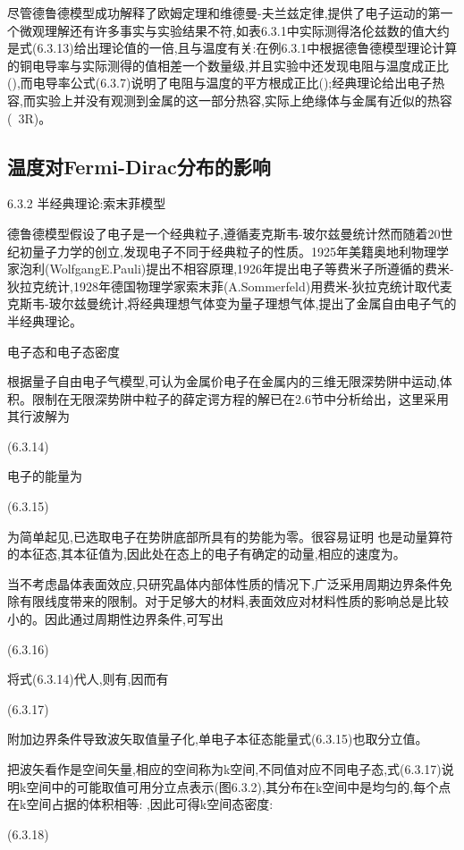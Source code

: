 尽管德鲁德模型成功解释了欧姆定理和维德曼-夫兰兹定律,提供了电子运动的第一个微观理解还有许多事实与实验结果不符,如表6.3.1中实际测得洛伦兹数的值大约是式(6.3.13)给出理论值的一倍,且与温度有关:在例6.3.1中根据德鲁德模型理论计算的铜电导率与实际测得的值相差一个数量级,并且实验中还发现电阻与温度成正比(),而电导率公式(6.3.7)说明了电阻与温度的平方根成正比();经典理论给出电子热容,而实验上并没有观测到金属的这一部分热容,实际上绝缘体与金属有近似的热容(~3R)。


\subsection{温度对Fermi-Dirac分布的影响}
6.3.2 半经典理论:索末菲模型

德鲁德模型假设了电子是一个经典粒子,遵循麦克斯韦-玻尔兹曼统计然而随着20世纪初量子力学的创立,发现电子不同于经典粒子的性质。1925年美籍奥地利物理学家泡利(WolfgangE.Pauli)提出不相容原理,1926年提出电子等费米子所遵循的费米-狄拉克统计,1928年德国物理学家索末菲(A.Sommerfeld)用费米-狄拉克统计取代麦克斯韦-玻尔兹曼统计,将经典理想气体变为量子理想气体,提出了金属自由电子气的半经典理论。

电子态和电子态密度

根据量子自由电子气模型,可认为金属价电子在金属内的三维无限深势阱中运动,体积。限制在无限深势阱中粒子的薛定谔方程的解已在2.6节中分析给出，这里采用其行波解为

 	(6.3.14)



电子的能量为

 	(6.3.15)

为简单起见,已选取电子在势阱底部所具有的势能为零。很容易证明 也是动量算符的本征态,其本征值为,因此处在态上的电子有确定的动量,相应的速度为。

当不考虑晶体表面效应,只研究晶体内部体性质的情况下,广泛采用周期边界条件免除有限线度带来的限制。对于足够大的材料,表面效应对材料性质的影响总是比较小的。因此通过周期性边界条件,可写出

 	(6.3.16)

将式(6.3.14)代人,则有,因而有

	 (6.3.17)

附加边界条件导致波矢取值量子化,单电子本征态能量式(6.3.15)也取分立值。

把波矢看作是空间矢量,相应的空间称为k空间,不同值对应不同电子态,式(6.3.17)说明k空间中的可能取值可用分立点表示(图6.3.2),其分布在k空间中是均匀的,每个点在k空间占据的体积相等: ,因此可得k空间态密度:

 	(6.3.18)



